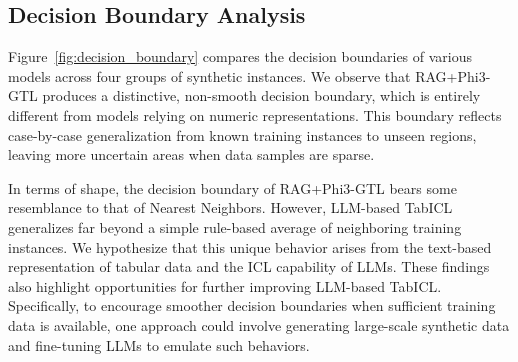 \subsection{Decision Boundary Analysis}
\label{sec:exp_dec_bound}

Figure~\ref{fig:decision_boundary} compares the decision boundaries of various models across four groups of synthetic instances.
We observe that RAG+Phi3-GTL produces a distinctive, non-smooth decision boundary, which is entirely different from models relying on numeric representations. This boundary reflects case-by-case generalization from known training instances to unseen regions, leaving more uncertain areas when data samples are sparse.

In terms of shape, the decision boundary of RAG+Phi3-GTL bears some resemblance to that of Nearest Neighbors. However, LLM-based TabICL generalizes far beyond a simple rule-based average of neighboring training instances. We hypothesize that this unique behavior arises from the text-based representation of tabular data and the ICL capability of LLMs.
These findings also highlight opportunities for further improving LLM-based TabICL. Specifically, to encourage smoother decision boundaries when sufficient training data is available, one approach could involve generating large-scale synthetic data and fine-tuning LLMs to emulate such behaviors.






